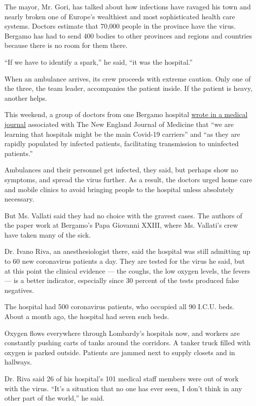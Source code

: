 The mayor, Mr. Gori, has talked about how infections have ravaged his
town and nearly broken one of Europe's wealthiest and most sophisticated
health care systems. Doctors estimate that 70,000 people in the province
have the virus. Bergamo has had to send 400 bodies to other provinces
and regions and countries because there is no room for them there.

``If we have to identify a spark,'' he said, ``it was the hospital.''

When an ambulance arrives, its crew proceeds with extreme caution. Only
one of the three, the team leader, accompanies the patient inside. If
the patient is heavy, another helps.

This weekend, a group of doctors from one Bergamo hospital
\href{https://catalyst.nejm.org/doi/full/10.1056/CAT.20.0080?fbclid=IwAR0wa6jzq-t_YYlZlYQtWiVmphT8pjyGBCndLhJGSN34dBaeZJoGP0sfneo}{wrote
in a medical journal} associated with The New England Journal of
Medicine that ``we are learning that hospitals might be the main
Covid-19 carriers'' and ``as they are rapidly populated by infected
patients, facilitating transmission to uninfected patients.''

Ambulances and their personnel get infected, they said, but perhaps show
no symptoms, and spread the virus further. As a result, the doctors
urged home care and mobile clinics to avoid bringing people to the
hospital unless absolutely necessary.

But Ms. Vallati said they had no choice with the gravest cases. The
authors of the paper work at Bergamo's Papa Giovanni XXIII, where Ms.
Vallati's crew have taken many of the sick.

Dr. Ivano Riva, an anesthesiologist there, said the hospital was still
admitting up to 60 new coronavirus patients a day. They are tested for
the virus he said, but at this point the clinical evidence --- the
coughs, the low oxygen levels, the fevers --- is a better indicator,
especially since 30 percent of the tests produced false negatives.

The hospital had 500 coronavirus patients, who occupied all 90 I.C.U.
beds. About a month ago, the hospital had seven such beds.

Oxygen flows everywhere through Lombardy's hospitals now, and workers
are constantly pushing carts of tanks around the corridors. A tanker
truck filled with oxygen is parked outside. Patients are jammed next to
supply closets and in hallways.

Dr. Riva said 26 of his hospital's 101 medical staff members were out of
work with the virus. ``It's a situation that no one has ever seen, I
don't think in any other part of the world,'' he said.

